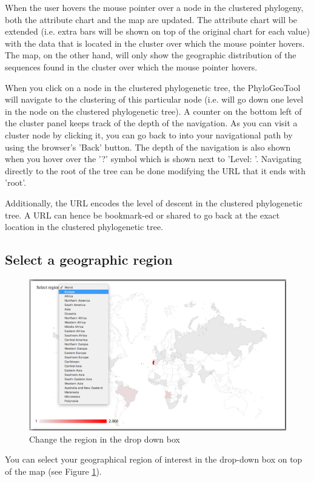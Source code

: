 \documentclass[a4paper, 11pt]{article} %
\begin{document}
When the user hovers the mouse pointer over a node in the clustered phylogeny, both the attribute chart and the map are updated. 
The attribute chart will be extended (i.e. extra bars will be shown on top of the original chart for each value) with the data that is located in the cluster over which the mouse pointer hovers.
The map, on the other hand, will only show the geographic distribution of the sequences found in the cluster over which the mouse pointer hovers.

When you click on a node in the clustered phylogenetic tree, the PhyloGeoTool will navigate to the clustering of this particular node (i.e. will go down one level in the node on the clustered phylogenetic tree).
A counter on the bottom left of the cluster panel keeps track of the depth of the navigation. 
As you can visit a cluster node by clicking it, you can go back to into your navigational path by using the browser's 'Back' button.
The depth of the navigation is also shown when you hover over the '?' symbol which is shown next to 'Level: '. 
Navigating directly to the root of the tree can be done modifying the URL that it ends with 'root'. 

Additionally, the URL encodes the level of descent in the clustered phylogenetic tree. 
A URL can hence be bookmark-ed or shared to go back at the exact location in the clustered phylogenetic tree. 


\subsection{Select a geographic region}
\begin{figure}[H]
\centering
\includegraphics[scale=0.38]{images/change_country.PNG}
\vspace{-0.75cm}
\caption{Change the region in the drop down box}
\label{fig:change_region}
\end{figure}
You can select your geographical region of interest in the drop-down box on top of the map (see Figure \ref{fig:change_region}). 
\end{document}
